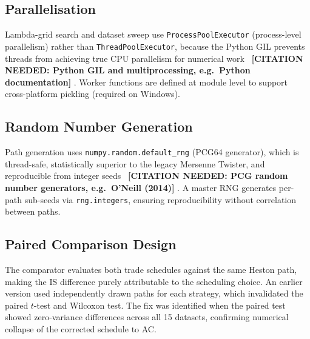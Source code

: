\documentclass[11pt]{article}
\newcommand{\needscite}[1]{%
  {\color{red}\textbf{[CITATION NEEDED: #1]}}%
}
\begin{document}
\subsection{Parallelisation}

Lambda-grid search and dataset sweep use \texttt{ProcessPoolExecutor} (process-level
parallelism) rather than \texttt{ThreadPoolExecutor}, because the Python GIL prevents
threads from achieving true CPU parallelism for numerical work~\needscite{Python GIL and multiprocessing, e.g.\ Python documentation}.
Worker functions are defined at module level to support cross-platform pickling
(required on Windows).

\subsection{Random Number Generation}

Path generation uses \texttt{numpy.random.default\_rng} (PCG64 generator), which is
thread-safe, statistically superior to the legacy Mersenne Twister, and reproducible
from integer seeds~\needscite{PCG random number generators, e.g.\ O'Neill (2014)}.
A master RNG generates per-path sub-seeds via \texttt{rng.integers}, ensuring reproducibility
without correlation between paths.

\subsection{Paired Comparison Design}

The comparator evaluates both trade schedules against the same Heston path, making the
IS difference purely attributable to the scheduling choice. An earlier version used
independently drawn paths for each strategy, which invalidated the paired $t$-test and
Wilcoxon test. The fix was identified when the paired test showed zero-variance differences
across all 15 datasets, confirming numerical collapse of the corrected schedule to AC.

\printbibliography
\end{document}
